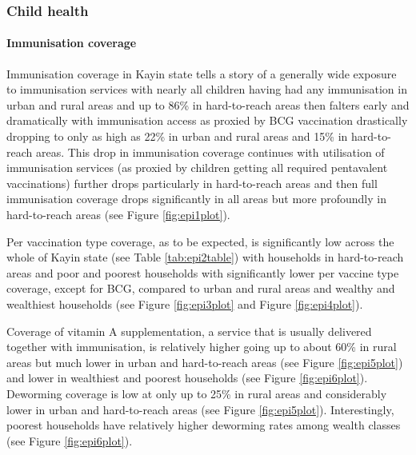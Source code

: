 \documentclass[12pt,a4paper]{article}
\let\oldparagraph\paragraph
\renewcommand{\paragraph}[1]{\oldparagraph{#1}\mbox{}}
\begin{document}
\hypertarget{chealth-results}{%
\subsubsection{Child health}\label{chealth-results}}

\hypertarget{epi-results}{%
\paragraph{Immunisation coverage}\label{epi-results}}

Immunisation coverage in Kayin state tells a story of a generally wide exposure to immunisation services with nearly all children having had any immunisation in urban and rural areas and up to 86\% in hard-to-reach areas then falters early and dramatically with immunisation access as proxied by BCG vaccination drastically dropping to only as high as 22\% in urban and rural areas and 15\% in hard-to-reach areas. This drop in immunisation coverage continues with utilisation of immunisation services (as proxied by children getting all required pentavalent vaccinations) further drops particularly in hard-to-reach areas and then full immunisation coverage drops significantly in all areas but more profoundly in hard-to-reach areas (see Figure \ref{fig:epi1plot}).

Per vaccination type coverage, as to be expected, is significantly low across the whole of Kayin state (see Table \ref{tab:epi2table}) with households in hard-to-reach areas and poor and poorest households with significantly lower per vaccine type coverage, except for BCG, compared to urban and rural areas and wealthy and wealthiest households (see Figure \ref{fig:epi3plot} and Figure \ref{fig:epi4plot}).

Coverage of vitamin A supplementation, a service that is usually delivered together with immunisation, is relatively higher going up to about 60\% in rural areas but much lower in urban and hard-to-reach areas (see Figure \ref{fig:epi5plot}) and lower in wealthiest and poorest households (see Figure \ref{fig:epi6plot}). Deworming coverage is low at only up to 25\% in rural areas and considerably lower in urban and hard-to-reach areas (see Figure \ref{fig:epi5plot}). Interestingly, poorest households have relatively higher deworming rates among wealth classes (see Figure \ref{fig:epi6plot}).
\end{document}

